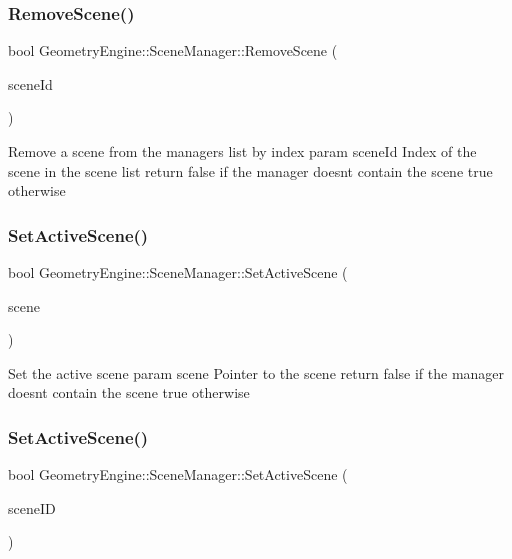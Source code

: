 \subsubsection{\texorpdfstring{RemoveScene()}{RemoveScene()}\hspace{0.1cm}{\footnotesize\ttfamily [2/2]}}
{\footnotesize\ttfamily bool Geometry\+Engine\+::\+Scene\+Manager\+::\+Remove\+Scene (\begin{DoxyParamCaption}\item[{unsigned int}]{scene\+Id }\end{DoxyParamCaption})}

Remove a scene from the manager\textquotesingle{}s list by index param scene\+Id Index of the scene in the scene list return false if the manager doesn\textquotesingle{}t contain the scene true otherwise \mbox{\label{class_geometry_engine_1_1_scene_manager_a0d493622807bb55d8e33a313ca61a3db}} 
\subsubsection{\texorpdfstring{SetActiveScene()}{SetActiveScene()}\hspace{0.1cm}{\footnotesize\ttfamily [1/2]}}
{\footnotesize\ttfamily bool Geometry\+Engine\+::\+Scene\+Manager\+::\+Set\+Active\+Scene (\begin{DoxyParamCaption}\item[{\mbox{\hyperlink{class_geometry_engine_1_1_geometry_scene_1_1_geometry_scene}{Geometry\+Scene\+::\+Geometry\+Scene}} $\ast$}]{scene }\end{DoxyParamCaption})}

Set the active scene param scene Pointer to the scene return false if the manager doesn\textquotesingle{}t contain the scene true otherwise \mbox{\label{class_geometry_engine_1_1_scene_manager_a2a188fd362d750afeca3aa79102fc9de}} 
\subsubsection{\texorpdfstring{SetActiveScene()}{SetActiveScene()}\hspace{0.1cm}{\footnotesize\ttfamily [2/2]}}
{\footnotesize\ttfamily bool Geometry\+Engine\+::\+Scene\+Manager\+::\+Set\+Active\+Scene (\begin{DoxyParamCaption}\item[{unsigned int}]{scene\+ID }\end{DoxyParamCaption})}

